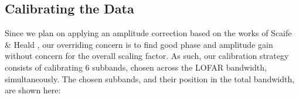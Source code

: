 \subsection{Calibrating the Data}
\pg
Since we plan on applying an amplitude correction based on the works of Scaife \& Heald \citep[see][]{arse}, our overriding concern is to find good phase and amplitude gain without concern for the overall scaling factor. As such, our calibration strategy consists of calibrating 6 subbands, chosen across the LOFAR bandwidth, simultaneously. The chosen subbands, and their position in the total bandwidth, are shown here:
\begin{figure}[h]
\begin{floatrow}
\end{floatrow}
\end{figure}

